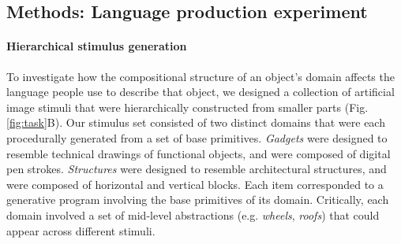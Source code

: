 \documentclass[10pt,letterpaper]{article}
\begin{document}
\subsection{Methods: Language production experiment}



\paragraph{Hierarchical stimulus generation} %




To investigate how the compositional structure of an object's domain affects the language people use to describe that object, we designed a collection of artificial image stimuli that were hierarchically constructed from smaller parts  (Fig. \ref{fig:task}B).
Our stimulus set consisted of two distinct domains that were each procedurally generated from a set of base primitives.
\textit{Gadgets} were designed to resemble technical drawings of functional objects, and were composed of digital pen strokes.
\textit{Structures} were designed to resemble architectural structures, and were composed of horizontal and vertical blocks.
Each item corresponded to a generative program involving the base primitives of its domain. 
Critically, each domain involved a set of mid-level abstractions  (e.g. \textit{wheels}, \textit{roofs}) that could appear across different stimuli. 
\end{document}
